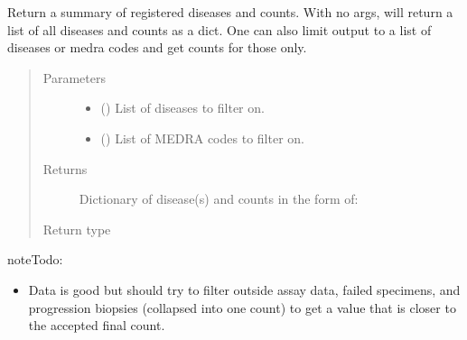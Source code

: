 \documentclass[letterpaper,10pt,english]{sphinxmanual}
\begin{document}
\begin{fulllineitems}
\begin{fulllineitems}
\end{fulllineitems}


\begin{fulllineitems}
\label{\detokenize{matchbox_api_utils:matchbox_api_utils.match_data.MatchData.get_disease_summary}}
Return a summary of registered diseases and counts. With no args, will
return a list of all diseases and counts as a dict. One can also limit
output to a list of diseases or medra codes and get counts for those only.
\begin{quote}\begin{description}
\item[{Parameters}] \leavevmode\begin{itemize}
\item {} 
 () \textendash{} List of diseases to filter on.

\item {} 
 () \textendash{} List of MEDRA codes to filter on.

\end{itemize}

\item[{Returns}] \leavevmode

Dictionary of disease(s) and counts in the form of:

%
\begin{sphinxVerbatim}[commandchars=\\\{\}]
   
\end{sphinxVerbatim}


\item[{Return type}] \leavevmode
{}

\end{description}\end{quote}

\begin{sphinxadmonition}{note}{\label{matchbox_api_utils:index-1}Todo:}\begin{itemize}
\item {} 
Data is good but should try to filter outside assay data, failed
specimens, and progression biopsies (collapsed into one count) to
get a value that is closer to the accepted final count.


\end{itemize}
\end{sphinxadmonition}
\end{fulllineitems}
\end{fulllineitems}
\end{document}
